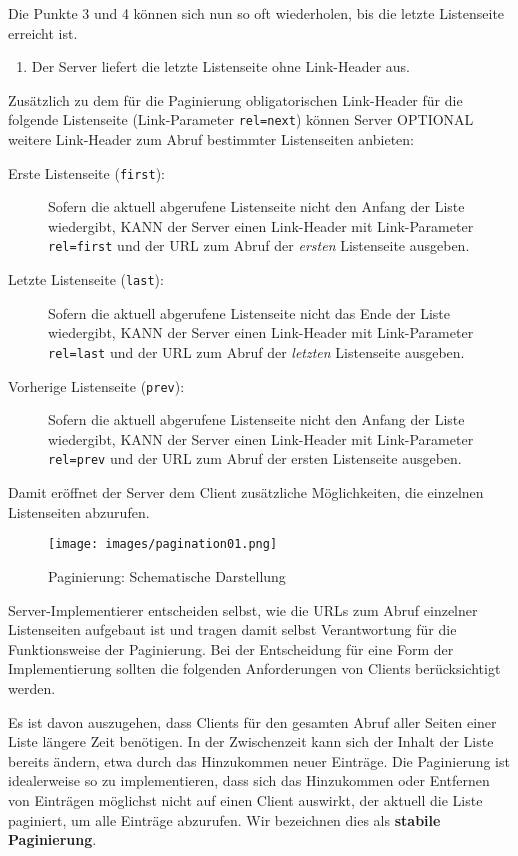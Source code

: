 \documentclass[,a4paper]{article}
\makeatletter
\def\maxwidth{\ifdim\Gin@nat@width>\linewidth\linewidth
\else\Gin@nat@width\fi}
\let\Oldincludegraphics\includegraphics
\renewcommand{\includegraphics}[1]{\Oldincludegraphics[width=\maxwidth]{#1}}
\makeatother
\begin{document}
Die Punkte 3 und 4 können sich nun so oft wiederholen, bis die letzte
Listenseite erreicht ist.

\begin{enumerate}
\def\labelenumi{\arabic{enumi}.}
\setcounter{enumi}{4}
\itemsep1pt\parskip0pt
\item
  Der Server liefert die letzte Listenseite ohne Link-Header aus.
\end{enumerate}

Zusätzlich zu dem für die Paginierung obligatorischen Link-Header für
die folgende Listenseite (Link-Parameter \texttt{rel=next}) können
Server OPTIONAL weitere Link-Header zum Abruf bestimmter Listenseiten
anbieten:

\begin{description}
\item[Erste Listenseite (\texttt{first}):]
Sofern die aktuell abgerufene Listenseite nicht den Anfang der Liste
wiedergibt, KANN der Server einen Link-Header mit Link-Parameter
\texttt{rel=first} und der URL zum Abruf der \emph{ersten} Listenseite
ausgeben.
\item[Letzte Listenseite (\texttt{last}):]
Sofern die aktuell abgerufene Listenseite nicht das Ende der Liste
wiedergibt, KANN der Server einen Link-Header mit Link-Parameter
\texttt{rel=last} und der URL zum Abruf der \emph{letzten} Listenseite
ausgeben.
\item[Vorherige Listenseite (\texttt{prev}):]
Sofern die aktuell abgerufene Listenseite nicht den Anfang der Liste
wiedergibt, KANN der Server einen Link-Header mit Link-Parameter
\texttt{rel=prev} und der URL zum Abruf der ersten Listenseite ausgeben.
\end{description}

Damit eröffnet der Server dem Client zusätzliche Möglichkeiten, die
einzelnen Listenseiten abzurufen.

\begin{figure}[htbp]
\centering
\texttt{[image: images/pagination01.png]}
\caption{Paginierung: Schematische Darstellung}
\end{figure}

Server-Implementierer entscheiden selbst, wie die URLs zum Abruf
einzelner Listenseiten aufgebaut ist und tragen damit selbst
Verantwortung für die Funktionsweise der Paginierung. Bei der
Entscheidung für eine Form der Implementierung sollten die folgenden
Anforderungen von Clients berücksichtigt werden.

Es ist davon auszugehen, dass Clients für den gesamten Abruf aller
Seiten einer Liste längere Zeit benötigen. In der Zwischenzeit kann sich
der Inhalt der Liste bereits ändern, etwa durch das Hinzukommen neuer
Einträge. Die Paginierung ist idealerweise so zu implementieren, dass
sich das Hinzukommen oder Entfernen von Einträgen möglichst nicht auf
einen Client auswirkt, der aktuell die Liste paginiert, um alle Einträge
abzurufen. Wir bezeichnen dies als \textbf{stabile Paginierung}.
\end{document}
